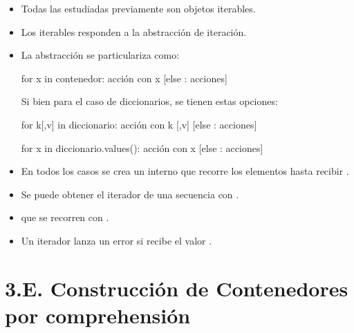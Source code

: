 \begin{itemize}
	\item Todas las  estudiadas previamente son objetos iterables.
	\item Los iterables responden a la abstracción de iteración.
	\item La abstracción se particulariza como:

\hfil
\begin{minipage}{.25\textwidth}
\begin{pyverbatim}[][frame=single, fontsize=\footnotesize]
for x in contenedor:
    acción con x
[else : acciones]
\end{pyverbatim}
\end{minipage}

Si bien para el caso de diccionarios, se tienen estas opciones:

\hfil
\begin{minipage}{.3\textwidth}
\begin{pyverbatim}[][frame=single, fontsize=\footnotesize]
for k[,v] in diccionario:
    acción con k [,v]
[else : acciones]
\end{pyverbatim}
\end{minipage}
%
%
\begin{minipage}{.3\textwidth}
\begin{pyverbatim}[][frame=single, fontsize=\footnotesize]
for x in diccionario.values():
    acción con x
[else : acciones]
\end{pyverbatim}
\end{minipage}

	
	\item En todos los casos se crea un  interno que recorre los elementos hasta recibir .
	
	\item Se puede obtener el iterador de una secuencia con .
	\item {} que se recorren con .
	\item Un iterador lanza un error si  recibe el valor .
\end{itemize}





\section*{3.E. Construcción de Contenedores por comprehensión}
\label{sec:Comprehension}

